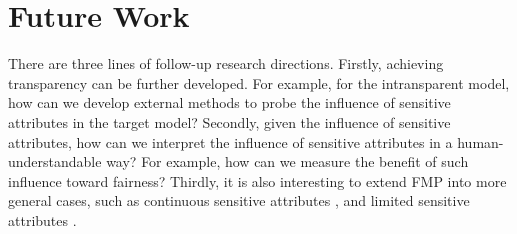 \documentclass[letterpaper]{article} %
\theoremstyle{plain}
\theoremstyle{definition}
\theoremstyle{remark}
\begin{document}

\section{Future Work}
There are three lines of follow-up research directions. Firstly, achieving transparency can be further developed. For example, for the intransparent model, how can we develop external methods to probe the influence of sensitive attributes in the target model? Secondly, given the influence of sensitive attributes, how can we interpret the influence of sensitive attributes in a human-understandable way? For example, how can we measure the benefit of such influence toward fairness? Thirdly, it is also interesting to extend FMP into more general cases, such as continuous sensitive attributes \citep{jiang2022generalized}, and limited sensitive attributes \citep{dai2021say}.
\end{document}
